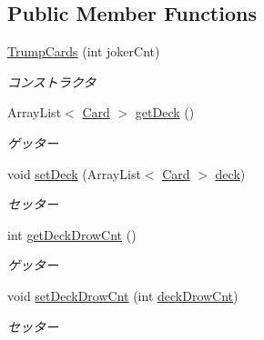 \subsection*{Public Member Functions}
\begin{DoxyCompactItemize}
\item 
\hyperlink{classjp_1_1gr_1_1java__conf_1_1yuta__yoshinaga_1_1java__trumpcards_1_1_trump_cards_aa72c9dd291a7af6a879f7d501debe4cd}{Trump\+Cards} (int joker\+Cnt)
\begin{DoxyCompactList}\small\item\em コンストラクタ \end{DoxyCompactList}\item 
Array\+List$<$ \hyperlink{classjp_1_1gr_1_1java__conf_1_1yuta__yoshinaga_1_1java__trumpcards_1_1_card}{Card} $>$ \hyperlink{classjp_1_1gr_1_1java__conf_1_1yuta__yoshinaga_1_1java__trumpcards_1_1_trump_cards_a45f2e4f7204b7fed4689e9187791df23}{get\+Deck} ()
\begin{DoxyCompactList}\small\item\em ゲッター \end{DoxyCompactList}\item 
void \hyperlink{classjp_1_1gr_1_1java__conf_1_1yuta__yoshinaga_1_1java__trumpcards_1_1_trump_cards_a03b3d1fbcd1d4aaf2ae750ba7c68b9c7}{set\+Deck} (Array\+List$<$ \hyperlink{classjp_1_1gr_1_1java__conf_1_1yuta__yoshinaga_1_1java__trumpcards_1_1_card}{Card} $>$ \hyperlink{classjp_1_1gr_1_1java__conf_1_1yuta__yoshinaga_1_1java__trumpcards_1_1_trump_cards_a313f49864c7810e4fdcd26ecd3e89ec9}{deck})
\begin{DoxyCompactList}\small\item\em セッター \end{DoxyCompactList}\item 
int \hyperlink{classjp_1_1gr_1_1java__conf_1_1yuta__yoshinaga_1_1java__trumpcards_1_1_trump_cards_a3af28b4f707526b638eb976ce8b348e7}{get\+Deck\+Drow\+Cnt} ()
\begin{DoxyCompactList}\small\item\em ゲッター \end{DoxyCompactList}\item 
void \hyperlink{classjp_1_1gr_1_1java__conf_1_1yuta__yoshinaga_1_1java__trumpcards_1_1_trump_cards_afe29b19a537d9a7416dc4c3b289d3b2b}{set\+Deck\+Drow\+Cnt} (int \hyperlink{classjp_1_1gr_1_1java__conf_1_1yuta__yoshinaga_1_1java__trumpcards_1_1_trump_cards_a07cfdc2af869e26718dcdee36c661c38}{deck\+Drow\+Cnt})
\begin{DoxyCompactList}\small\item\em セッター \end{DoxyCompactList}\item 

\end{DoxyCompactItemize}
